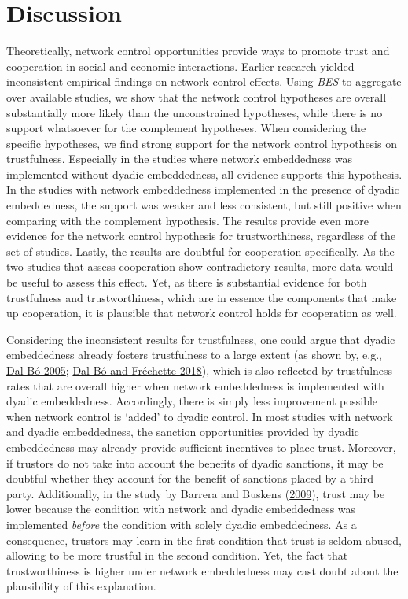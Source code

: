 \documentclass[
  11pt,
]{article}
\begin{document}
\hypertarget{discussion}{%
\section{Discussion}\label{discussion}}

Theoretically, network control opportunities provide ways to promote trust and cooperation in social and economic interactions.
Earlier research yielded inconsistent empirical findings on network control effects.
Using \emph{BES} to aggregate over available studies, we show that the network control hypotheses are overall substantially more likely than the unconstrained hypotheses, while there is no support whatsoever for the complement hypotheses.
When considering the specific hypotheses, we find strong support for the network control hypothesis on trustfulness.
Especially in the studies where network embeddedness was implemented without dyadic embeddedness, all evidence supports this hypothesis.
In the studies with network embeddedness implemented in the presence of dyadic embeddedness, the support was weaker and less consistent, but still positive when comparing with the complement hypothesis.
The results provide even more evidence for the network control hypothesis for trustworthiness, regardless of the set of studies.
Lastly, the results are doubtful for cooperation specifically.
As the two studies that assess cooperation show contradictory results, more data would be useful to assess this effect.
Yet, as there is substantial evidence for both trustfulness and trustworthiness, which are in essence the components that make up cooperation, it is plausible that network control holds for cooperation as well.

Considering the inconsistent results for trustfulness, one could argue that dyadic embeddedness already fosters trustfulness to a large extent (as shown by, e.g., \protect\hyperlink{ref-dal_buxf3_cooperation_2005}{Dal Bó 2005}; \protect\hyperlink{ref-dal_buxf3_fruxe9chette_determinants_2018}{Dal Bó and Fréchette 2018}), which is also reflected by trustfulness rates that are overall higher when network embeddedness is implemented with dyadic embeddedness.
Accordingly, there is simply less improvement possible when network control is `added' to dyadic control.
In most studies with network and dyadic embeddedness, the sanction opportunities provided by dyadic embeddedness may already provide sufficient incentives to place trust.
Moreover, if trustors do not take into account the benefits of dyadic sanctions, it may be doubtful whether they account for the benefit of sanctions placed by a third party.
Additionally, in the study by Barrera and Buskens (\protect\hyperlink{ref-barrera_buskens_third_2009}{2009}), trust may be lower because the condition with network and dyadic embeddedness was implemented \emph{before} the condition with solely dyadic embeddedness.
As a consequence, trustors may learn in the first condition that trust is seldom abused, allowing to be more trustful in the second condition.
Yet, the fact that trustworthiness is higher under network embeddedness may cast doubt about the plausibility of this explanation.
\end{document}
